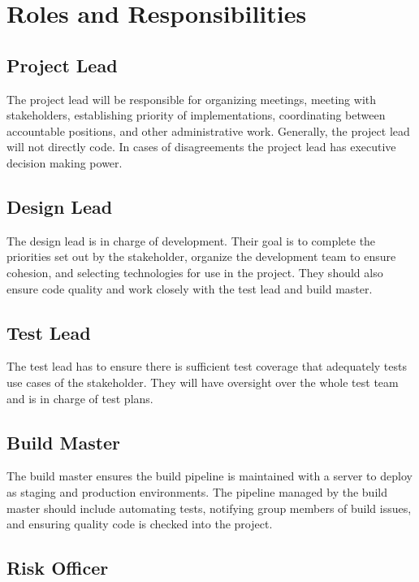 \documentclass{scrreprt}
\begin{document}
\section{Roles and Responsibilities}

\subsection{Project Lead}

The project lead will be responsible for organizing meetings,
meeting with stakeholders, establishing priority of implementations, coordinating
between accountable positions, and other administrative work. 
Generally, the project lead will not directly code.
In cases of disagreements the project lead has executive decision making power.

\subsection{Design Lead}

The design lead is in charge of development. Their goal is
to complete the priorities set out by the stakeholder, organize
the development team to ensure cohesion, and selecting technologies
for use in the project. They should also ensure code quality and
work closely with the test lead and build master.

\subsection{Test Lead}

The test lead has to ensure there is sufficient test coverage
that adequately tests use cases of the stakeholder. They will
have oversight over the whole test team and is in charge of 
test plans.

\subsection{Build Master}

The build master ensures the build pipeline is maintained with
a server to deploy as staging and production environments. The
pipeline managed by the build master should include automating
tests, notifying group members of build issues, and ensuring
quality code is checked into the project.

\subsection{Risk Officer}
\end{document}
